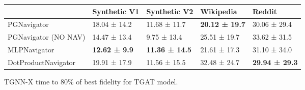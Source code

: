 \begin{tabular}{lllll}
\toprule
 & Synthetic V1 & Synthetic V2 & Wikipedia & Reddit \\
\midrule
PGNavigator & 18.04 ± 14.2 & 11.68 ± 11.7 & \bfseries 20.12 ± 19.7 & 30.06 ± 29.4 \\
PGNavigator (NO NAV) & 14.47 ± 13.4 & 9.75 ± 13.4 & 25.51 ± 19.7 & 33.62 ± 31.5 \\
MLPNavigator & \bfseries 12.62 ± 9.9 & \bfseries 11.36 ± 14.5 & 21.61 ± 17.3 & 31.10 ± 34.0 \\
DotProductNavigator & 19.91 ± 17.9 & 11.56 ± 15.5 & 32.48 ± 24.7 & \bfseries 29.94 ± 29.3 \\
\bottomrule
\end{tabular}
\caption{\label{tab:tgat_time}TGNN-X time to 80\% of best fidelity for TGAT model.}

